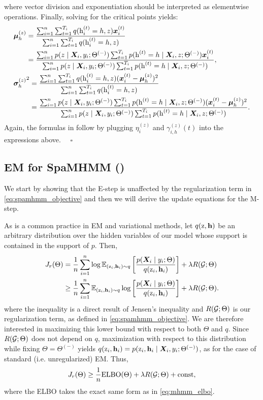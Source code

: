 where vector division and exponentiation should be interpreted as elementwise operations. Finally, solving for the critical points yields:
\begin{align}
&\vmu^{(z)}_h = \frac{\sum_{i=1}^n  \sum_{t=1}^{T_i} q(\rh^{(t)}_i=h, z) \vx^{(t)}_i}{\sum_{i=1}^n  \sum_{t=1}^{T_i} q(\rh^{(t)}_i=h, z)} \nonumber\\
&\hphantom{\vmu^{(z)}_h} = \frac{\sum_{i=1}^n p(z \mid \mX_i, y_i; \Theta^{(-)}) \sum_{t=1}^{T_i} p(\rh^{(t)}=h \mid \mX_i, z; \Theta^{(-)}) \vx^{(t)}_i}{\sum_{i=1}^n p(z \mid \mX_i, y_i; \Theta^{(-)}) \sum_{t=1}^{T_i} p(\rh^{(t)}=h \mid \mX_i, z; \Theta^{(-)})}, \\
&{\vsigma^{(z)}_h}^2 = \frac{\sum_{i=1}^n  \sum_{t=1}^{T_i} q(\rh^{(t)}_i=h, z) (\vx^{(t)}_i - \vmu^{(z)}_h)^2}{\sum_{i=1}^n  \sum_{t=1}^{T_i} q(\rh^{(t)}_i=h, z)} \nonumber\\
&\hphantom{{\vsigma^{(z)}_h}^2} = \frac{\sum_{i=1}^n p(z \mid \mX_i, y_i; \Theta^{(-)}) \sum_{t=1}^{T_i} p(\rh^{(t)}=h \mid \mX_i, z; \Theta^{(-)}) (\vx^{(t)}_i - \vmu^{(z)}_h)^2}{\sum_{i=1}^n p(z \mid \mX_i, y_i; \Theta^{(-)}) \sum_{t=1}^{T_i} p(\rh^{(t)}=h \mid \mX_i, z; \Theta^{(-)})}.
\end{align}
Again, the formulas in  follow by plugging $\eta^{(z)}_i$ and $\gamma^{(z)}_{i,h}(t)$ into the expressions above. $\quad \square$

\subsection{EM for SpaMHMM ()}
\label{sec:proof_em_reg}
We start by showing that the E-step is unaffected by the regularization term in \eqref{eq:spamhmm_objective} and then we will derive the update equations for the M-step.

As is a common practice in EM and variational methods, let $q({\textnormal{z}}, {\mathbf{h}})$ be an arbitrary distribution over the hidden variables of our model whose support is contained in the support of $p$. Then,
\begin{align}
	J_r(\Theta) &= \frac{1}{n}\sum_{i=1}^n \log \mathbb{E}_{({\textnormal{z}}_i, {\mathbf{h}}_i) \sim q} \left[ \frac{p({\bm{X}}_i \mid y_i; \Theta)}{q({\textnormal{z}}_i, {\mathbf{h}}_i)} \right] + \lambda R({\mathcal{G}}; \Theta) \nonumber\\
	&\geq  \frac{1}{n}\sum_{i=1}^n \mathbb{E}_{({\textnormal{z}}_i, {\mathbf{h}}_i) \sim q} \log \left[ \frac{p({\bm{X}}_i \mid y_i; \Theta)}{q({\textnormal{z}}_i, {\mathbf{h}}_i)} \right] + \lambda R({\mathcal{G}}; \Theta).
\end{align}
where the inequality is a direct result of Jensen's inequality and $R({\mathcal{G}}; \Theta)$ is our regularization term, as defined in \eqref{eq:spamhmm_objective}. We are therefore interested in maximizing this lower bound with respect to both $\Theta$ and $q$. Since $R({\mathcal{G}}; \Theta)$ does not depend on $q$, maximization with respect to this distribution while fixing $\Theta = \Theta^{(-)}$ yields $q({\textnormal{z}}_i, {\mathbf{h}}_i) = p({\textnormal{z}}_i, {\mathbf{h}}_i \mid {\bm{X}}_i, y_i; \Theta^{(-)})$, as for the case of standard (i.e. unregularized) EM. Thus,
\begin{equation}
	J_r(\Theta) \geq \frac{1}{n} \mathrm{ELBO}(\Theta) + \lambda R({\mathcal{G}}; \Theta) + \text{const},
\end{equation}
where the ELBO takes the exact same form as in \eqref{eq:mhmm_elbo}. 

